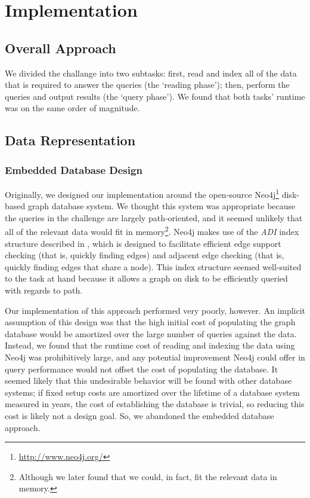 \documentclass{article}
\begin{document}

\section{Implementation}
\subsection{Overall Approach}
We divided the challange into two subtasks: first, read and index all
of the data that is required to answer the queries (the `reading
phase'); then, perform the queries and output results (the `query
phase').  We found that both tasks' runtime was on the same order of
magnitude.  

\subsection{Data Representation}
\subsubsection{Embedded Database Design}
Originally, we designed our implementation around the open-source
Neo4j\footnote{\url{http://www.neo4j.org/}} disk-based graph database
system.  We thought this system was appropriate because the queries in
the challenge are largely path-oriented, and it seemed unlikely that
all of the relevant data would fit in memory\footnote{Although we
  later found that we could, in fact, fit the relevant data in
  memory.}.  Neo4j makes use of the \emph{ADI} index structure
\cite[Chapter~6]{IanRobinson:2013ul} described in
\cite{wang2004scalable}, which is designed to facilitate efficient
edge support checking (that is, quickly finding edges) and adjacent
edge checking (that is, quickly finding edges that share a node).
This index structure seemed well-suited to the task at hand because it
allows a graph on disk to be efficiently queried with regards to path.

Our implementation of this approach performed very poorly, however.
An implicit assumption of this design was that the high initial cost of
populating the graph database would be amortized over the large number
of queries against the data.  Instead, we found that the runtime cost 
of reading and indexing the data using Neo4j was prohibitively large,
and any potential improvement Neo4j could offer in query performance
would not offset the cost of populating the database.
It seemed likely that this undesirable behavior will be found
with other database systems; if fixed setup costs are amortized over
the lifetime of a database system measured in years, the cost of
establishing the database is trivial, so reducing this cost is likely
not a design goal.  So, we abandoned the embedded database approach.
\end{document}
